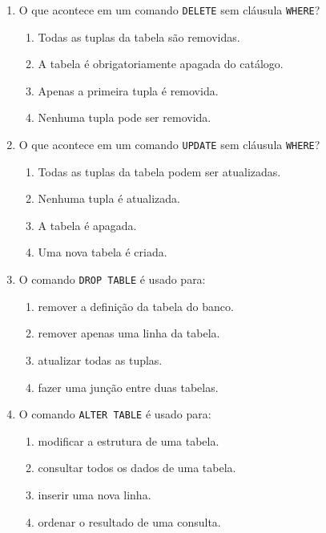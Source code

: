 \documentclass[12pt,a4paper]{article}
\begin{document}
\begin{enumerate}[label=\textbf{Q\arabic*.}]
\item O que acontece em um comando \texttt{DELETE} sem cláusula \texttt{WHERE}?

\begin{enumerate}[label=\alph*)]
    \item Todas as tuplas da tabela são removidas.
    \item A tabela é obrigatoriamente apagada do catálogo.
    \item Apenas a primeira tupla é removida.
    \item Nenhuma tupla pode ser removida.
\end{enumerate}

\item O que acontece em um comando \texttt{UPDATE} sem cláusula \texttt{WHERE}?

\begin{enumerate}[label=\alph*)]
    \item Todas as tuplas da tabela podem ser atualizadas.
    \item Nenhuma tupla é atualizada.
    \item A tabela é apagada.
    \item Uma nova tabela é criada.
\end{enumerate}

\item O comando \texttt{DROP TABLE} é usado para:

\begin{enumerate}[label=\alph*)]
    \item remover a definição da tabela do banco.
    \item remover apenas uma linha da tabela.
    \item atualizar todas as tuplas.
    \item fazer uma junção entre duas tabelas.
\end{enumerate}

\item O comando \texttt{ALTER TABLE} é usado para:

\begin{enumerate}[label=\alph*)]
    \item modificar a estrutura de uma tabela.
    \item consultar todos os dados de uma tabela.
    \item inserir uma nova linha.
    \item ordenar o resultado de uma consulta.
\end{enumerate}


\end{enumerate}
\end{document}
